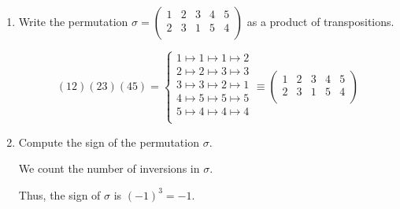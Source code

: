 \documentclass{article}
\begin{document}
\begin{problem}
\begin{enumerate}[label=(\alph*)]
	\item Write the permutation $\sigma = \begin{pmatrix}
			      1 & 2 & 3 & 4 & 5 \\
			      2 & 3 & 1 & 5 & 4 \\
		      \end{pmatrix}$ as a product of transpositions.
	      \begin{solution}
		      \[
			      (1 2)(2 3)(4 5) = \left\{\begin{aligned}
				      1 \mapsto 1 \mapsto 1 \mapsto 2 \\
				      2 \mapsto 2 \mapsto 3 \mapsto 3 \\
				      3 \mapsto 3 \mapsto 2 \mapsto 1 \\
				      4 \mapsto 5 \mapsto 5 \mapsto 5 \\
				      5 \mapsto 4 \mapsto 4 \mapsto 4 \\
			      \end{aligned}\right. \equiv \begin{pmatrix}
				      1 & 2 & 3 & 4 & 5 \\
				      2 & 3 & 1 & 5 & 4 \\
			      \end{pmatrix}
		      \]
	      \end{solution}

	\item Compute the sign of the permutation $\sigma$.
	      \begin{solution}
		      We count the number of inversions in $\sigma$.
		      \begin{center}
		      \end{center}
		      Thus, the sign of $\sigma$ is $(-1)^3 = -1$.
	      \end{solution}
\end{enumerate}
\end{problem}
\end{document}

